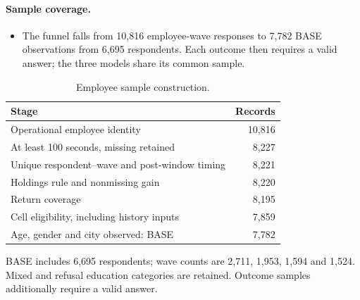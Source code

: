 \documentclass[11pt,letterpaper,english,final]{article}
\begin{document}
\paragraph{Sample coverage.}
\begin{itemize}
\item The funnel falls from 10,816 employee-wave responses to 7,782 BASE observations from 6,695 respondents. Each outcome then requires a valid answer; the three models share its common sample.
\end{itemize}
\begin{table}[H]
\centering\small
\setlength{\tabcolsep}{5pt}
\caption{Employee sample construction.}
\begin{tabular}{lr}
\toprule
Stage & Records \\
\midrule
Operational employee identity & 10,816 \\
At least 100 seconds, missing retained & 8,227 \\
Unique respondent--wave and post-window timing & 8,221 \\
Holdings rule and nonmissing gain & 8,220 \\
Return coverage & 8,195 \\
Cell eligibility, including history inputs & 7,859 \\
Age, gender and city observed: BASE & 7,782 \\
\bottomrule
\end{tabular}
\par\vspace{4pt}\begin{minipage}{\linewidth}\footnotesize BASE includes 6,695 respondents; wave counts are 2,711, 1,953, 1,594 and 1,524. Mixed and refusal education categories are retained. Outcome samples additionally require a valid answer.\end{minipage}
\end{table}
\end{document}
